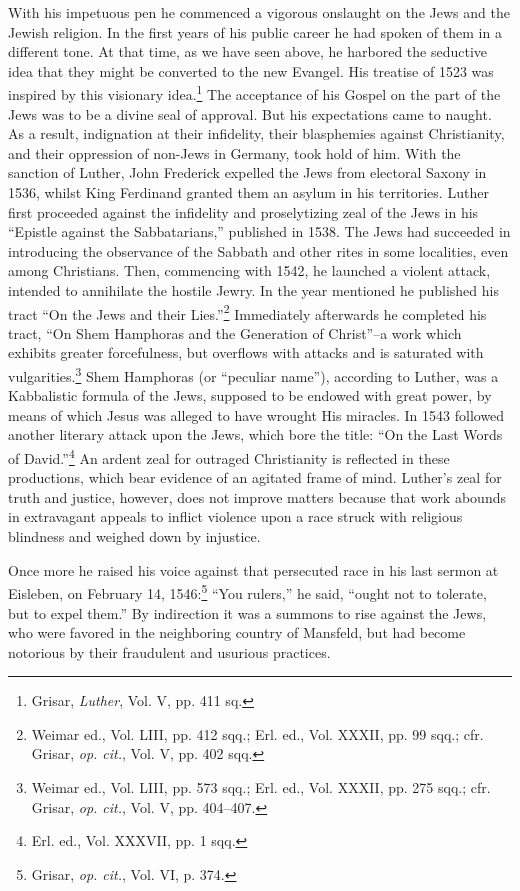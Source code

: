 With his impetuous pen he commenced a vigorous onslaught on
the Jews and the Jewish religion. In the first years of his public
career he had spoken of them in a different tone. At that time, as we
have seen above, he harbored the seductive idea that they might be
converted to the new Evangel. His treatise of 1523 was inspired by
this visionary idea.\footnote{Grisar, \textit{Luther}, Vol. V, pp. 411 sq.}
The acceptance of his Gospel on the part of the
Jews was to be a divine seal of approval. But his expectations came
to naught. As a result, indignation at their infidelity, their blasphemies
against Christianity, and their oppression of non-Jews in
Germany, took hold of him. With the sanction of Luther, John
Frederick expelled the Jews from electoral Saxony in 1536, whilst
King Ferdinand granted them an asylum in his territories.
Luther first proceeded against the infidelity and proselytizing zeal
of the Jews in his “Epistle against the Sabbatarians,” published in
1538. The Jews had succeeded in introducing the observance of the
Sabbath and other rites in some localities, even among Christians.
Then, commencing with 1542, he launched a violent attack, intended
to annihilate the hostile Jewry. In the year mentioned he published
his tract “On the Jews and their Lies.”\footnote
{Weimar ed., Vol. LIII, pp. 412 sqq.; Erl. ed., Vol. XXXII, pp. 99 sqq.; cfr. Grisar, \textit{op.
cit.}, Vol. V, pp. 402 sqq.}
Immediately afterwards he
completed his tract, “On Shem Hamphoras and the Generation of
Christ”--a work which exhibits greater forcefulness, but overflows
with attacks and is saturated with vulgarities.\footnote
{Weimar ed., Vol. LIII, pp. 573 sqq.; Erl. ed., Vol. XXXII, pp. 275 sqq.; cfr. Grisar,
\textit{op. cit.}, Vol. V, pp. 404--407.}
Shem Hamphoras (or
“peculiar name”), according to Luther, was a Kabbalistic formula of the
Jews, supposed to be endowed with great power, by means of which Jesus
was alleged to have wrought His miracles. In 1543 followed
another literary attack upon the Jews, which bore the title: “On the
Last Words of David.”\footnote{Erl. ed., Vol. XXXVII, pp. 1 sqq.}
An ardent zeal for outraged Christianity is reflected
in these productions, which bear evidence of an agitated frame of
mind. Luther’s zeal for truth and justice, however, does not improve
matters because that work abounds in extravagant appeals to inflict
violence upon a race struck with religious blindness and weighed
down by injustice.

Once more he raised his voice against that persecuted race in his last
sermon at Eisleben, on February 14, 1546:\footnote{Grisar, \textit{op. cit.}, Vol. VI, p. 374.}
“You rulers,” he said,
“ought not to tolerate, but to expel them.” By indirection it was a
summons to rise against the Jews, who were favored in the neighboring
country of Mansfeld, but had become notorious by their fraudulent
and usurious practices.

